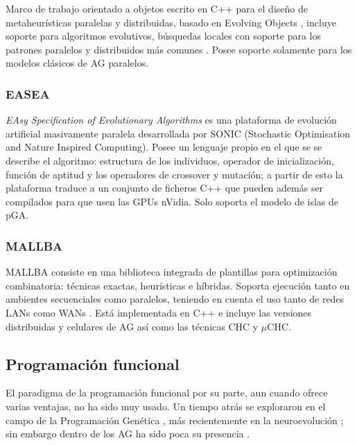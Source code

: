 \documentclass[runningheads]{llncs}
\begin{document}
Marco de trabajo orientado a objetos escrito en C++ para el diseño de metaheurísticas paralelas y distribuidas, basado en Evolving Objects \cite{Keijzer2001}, incluye soporte para algoritmos evolutivos, búsquedas locales con soporte para los patrones paralelos y distribuidos más comunes \cite{PARADISEO}. Posee soporte solamente para los modelos clásicos de AG paralelos.


\subsubsection{EASEA}

\emph{EAsy Specification of Evolutionary Algorithms} es una plataforma de evolución artificial masivamente paralela desarrollada por SONIC (Stochastic Optimisation and Nature Inspired Computing). Posee un lenguaje propio en el que se se describe el algoritmo: estructura de los individuos, operador de inicialización, función de aptitud y los operadores de crossover y mutación; a partir de esto la plataforma traduce a un conjunto de ficheros C++ que pueden además ser compilados para que usen las GPUs nVidia. Solo soporta el modelo de islas de pGA.

\subsubsection{MALLBA}

MALLBA consiste en una biblioteca integrada de plantillas para optimización combinatoria: técnicas exactas, heurísticas e híbridas. Soporta ejecución tanto en ambientes secuenciales como paralelos, teniendo en cuenta el uso tanto de redes LANs como WANs \cite{MALLBA}. Está implementada en C++ e incluye las versiones distribuidas y celulares de AG así como las técnicas CHC y $\mu$CHC.

\subsection{Programación funcional}

El paradigma de la programación funcional por su parte, aun cuando ofrece varias ventajas, no ha sido muy usado. Un tiempo atrás se exploraron en el campo de la Programación Genética \cite{Briggs:2008:FGP:1375341.1375345,Huelsbergen:1996:TSE:1595536.1595579,walsh:1999:AFSFESIHLP}, más recientemente en la neuroevolución  \cite{Sher2013}; sin embargo dentro de los AG ha sido poca su presencia \cite{Hawkins:2001:GFG:872017.872197}.
\end{document}
